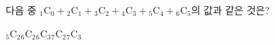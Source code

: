 다음 중 ${}_1\mathrm{C}_0+{}_2\mathrm{C}_1+{}_3\mathrm{C}_2+{}_4\mathrm{C}_3+{}_5\mathrm{C}_4+{}_6\mathrm{C}_5$의 값과 같은 것은?
\begin{choices32}{${}_5\mathrm{C}_2$}{${}_6\mathrm{C}_2$}{${}_6\mathrm{C}_3$}{${}_7\mathrm{C}_2$}{${}_7\mathrm{C}_3$}\end{choices32}
